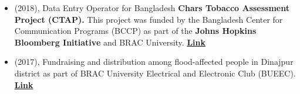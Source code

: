 \begin{itemize}[itemsep=-3pt, left=0pt]
    
    \item (2018), Data Entry Operator for Bangladesh \textbf{Chars Tobacco Assessment Project (CTAP).} This project was funded by the Bangladesh Center for Communication Programs (BCCP) as part of the \textbf {Johns Hopkins Bloomberg Initiative} and BRAC University. \textbf{{\href{https://dataverse.harvard.edu/dataset.xhtml?persistentId=doi:10.7910/DVN/YAAV4X}{Link}}}
    \item (2017), Fundraising and distribution among flood-affected people in Dinajpur district as part of BRAC University Electrical and Electronic Club (BUEEC). \textbf{{\href{https://www.bracu.ac.bd/club-forum/brac-university-electrical-electronic-club\#:~:text=SOCIAL}{Link}}}
    
\end{itemize}
\vspace{-12pt}

